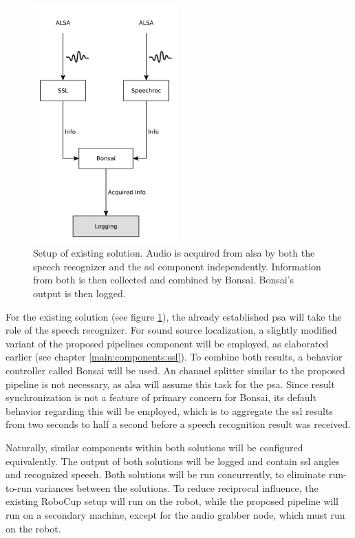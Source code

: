 \begin{figure}[]
	\centering
	\includegraphics[width=0.5\textwidth]{diagrams/eval_task_old.pdf}
	\caption{Setup of existing solution. 
		Audio is acquired from \gls{alsa} by both the speech recognizer and the \gls{ssl} component independently. 
		Information from both is then collected and combined by Bonsai.
		Bonsai's output is then logged.}
	\label{pic:eval_task_setup_old}
\end{figure}

For the existing solution (see figure \ref{pic:eval_task_setup_old}), the already established \gls{psa} will take the role of the speech recognizer.
For sound source localization, a slightly modified variant of the proposed pipelines component will be employed, as elaborated earlier (see chapter \ref{main:components:ssl}).
To combine both results, a behavior controller called Bonsai \cite{bonsai} will be used.
An channel splitter similar to the proposed pipeline is not necessary, as \gls{alsa} will assume this task for the \gls{psa}.
Since result synchronization is not a feature of primary concern for Bonsai, its default behavior regarding this will be employed, which is to aggregate the \gls{ssl} results from two seconds to half a second before a speech recognition result was received.

Naturally, similar components within both solutions will be configured equivalently.
The output of both solutions will be logged and contain \gls{ssl} angles and recognized speech.
Both solutions will be run concurrently, to eliminate run-to-run variances between the solutions.
To reduce reciprocal influence, the existing RoboCup setup will run on the robot, while the proposed pipeline will run on a secondary machine, except for the audio grabber node, which must run on the robot.

